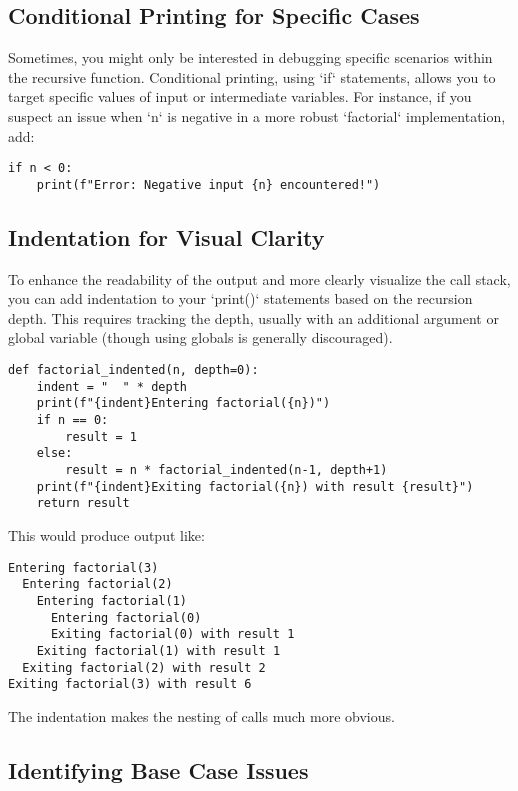 \documentclass{article}
\begin{document}
{{{\subsection*{Conditional Printing for Specific Cases}

Sometimes, you might only be interested in debugging specific scenarios within the recursive function.  Conditional printing, using `if` statements, allows you to target specific values of input or intermediate variables.  For instance, if you suspect an issue when `n` is negative in a more robust `factorial` implementation, add:

\begin{verbatim}
if n < 0:
    print(f"Error: Negative input {n} encountered!")
\end{verbatim}

\subsection*{Indentation for Visual Clarity}

To enhance the readability of the output and more clearly visualize the call stack, you can add indentation to your `print()` statements based on the recursion depth. This requires tracking the depth, usually with an additional argument or global variable (though using globals is generally discouraged).

\begin{verbatim}
def factorial_indented(n, depth=0):
    indent = "  " * depth
    print(f"{indent}Entering factorial({n})")
    if n == 0:
        result = 1
    else:
        result = n * factorial_indented(n-1, depth+1)
    print(f"{indent}Exiting factorial({n}) with result {result}")
    return result
\end{verbatim}

This would produce output like:

\begin{verbatim}
Entering factorial(3)
  Entering factorial(2)
    Entering factorial(1)
      Entering factorial(0)
      Exiting factorial(0) with result 1
    Exiting factorial(1) with result 1
  Exiting factorial(2) with result 2
Exiting factorial(3) with result 6
\end{verbatim}

The indentation makes the nesting of calls much more obvious.

\subsection*{Identifying Base Case Issues}

}}}
\end{document}
